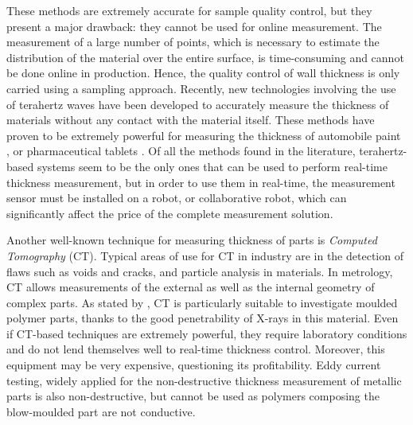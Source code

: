 These methods are extremely accurate for sample quality control, but they present a major drawback: they cannot be used for online measurement. The measurement of a large number of points, which is necessary to estimate the distribution of the material over the entire surface, is time-consuming and cannot be done online in production. Hence, the quality control of wall thickness is only carried using a sampling approach. Recently, new technologies involving the use of terahertz waves have been developed to accurately measure the thickness of materials without any contact with the material itself. These methods have proven to be extremely powerful for measuring the thickness of automobile paint \citep{su2014terahertz,krimi2016highly}, or pharmaceutical tablets \citep{may2011terahertz}. Of all the methods found in the literature, terahertz-based systems seem to be the only ones that can be used to perform real-time thickness measurement, but in order to use them in real-time, the measurement sensor must be installed on a robot, or collaborative robot, which can significantly affect the price of the complete measurement solution.

Another well-known technique for measuring thickness of parts is \textit{Computed Tomography} (CT). Typical areas of use for CT in industry are in the detection of flaws such as voids and cracks, and particle analysis in materials. In metrology, CT allows measurements of the external as well as the internal geometry of complex parts. As stated by \citet{de2014industrial}, CT is particularly suitable to investigate moulded polymer parts, thanks to the good penetrability of X-rays in this material. Even if CT-based techniques are extremely powerful, they require laboratory conditions and  do not lend themselves well to real-time thickness control. Moreover, this equipment may be very expensive, questioning its profitability.
%
Eddy current testing, widely applied for the non-destructive thickness measurement of metallic parts \citep{cheng2017thickness,mao2016thickness,wang2015noncontact,yin2007thickness}  is also non-destructive, but cannot be used as polymers composing the blow-moulded part are not conductive.

